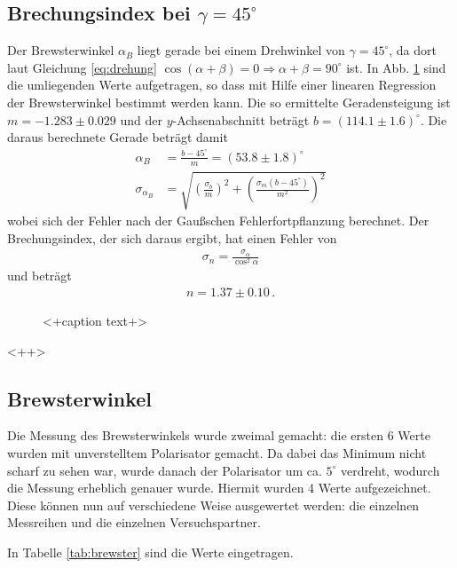\documentclass[12pt,a4paper,titlepage,headinclude,bibtotoc]{scrartcl}
\begin{document}
\subsection{Brechungsindex bei $\gamma=45^\circ$}
Der Brewsterwinkel $\alpha_B$ liegt gerade bei einem Drehwinkel von $\gamma=45^\circ$, da dort laut Gleichung \eqref{eq:drehung} $\cos (\alpha + \beta) = 0 \Rightarrow \alpha + \beta = 90^\circ$ ist.
In Abb. \ref{fig:brewster} sind die umliegenden Werte aufgetragen, so dass mit Hilfe einer linearen Regression der Brewsterwinkel bestimmt werden kann.
Die so ermittelte Geradensteigung ist $m=-1.283\pm 0.029$ und der $y$-Achsenabschnitt beträgt $b=(114.1\pm 1.6)^\circ$.
Die daraus berechnete Gerade beträgt damit
\begin{align}
	\alpha_B&=\frac{b-45^\circ}{m} = (53.8\pm 1.8)^\circ\\
	\sigma_{\alpha_B}&=\sqrt{\left( \frac{\sigma_b}{m} \right)^2 + \left( \frac{\sigma_m(b-45^\circ)}{m^2} \right)^2}
\end{align}
wobei sich der Fehler nach der Gaußschen Fehlerfortpflanzung berechnet.
Der Brechungsindex, der sich daraus ergibt, hat einen Fehler von
\begin{align*}
	\sigma_n=\frac{\sigma_\alpha}{\cos ^2\alpha}
\end{align*}
und beträgt 
\begin{align}
	n=1.37\pm 0.10\, .
\end{align}



\begin{figure}[h]
	\centering
	
	\caption{<+caption text+>}
	\label{fig:brewster}
\end{figure}<++>

\subsection{Brewsterwinkel}
Die Messung des Brewsterwinkels wurde zweimal gemacht: die ersten 6 Werte wurden mit unverstelltem Polarisator gemacht.
Da dabei das Minimum nicht scharf zu sehen war, wurde danach der Polarisator um ca. $5^\circ$ verdreht, wodurch die Messung erheblich genauer wurde.
Hiermit wurden 4 Werte aufgezeichnet.
Diese können nun auf verschiedene Weise ausgewertet werden: die einzelnen Messreihen und die einzelnen Versuchspartner.

In Tabelle \ref{tab:brewster} sind die Werte eingetragen.
\end{document}
